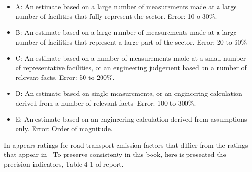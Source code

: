 \documentclass[12pt,graybox,envcountchap,sectrefs]{krantz}
\providecommand{\tightlist}{%
  \setlength{\itemsep}{0pt}\setlength{\parskip}{0pt}}
\theoremstyle{definition}
\theoremstyle{definition}
\theoremstyle{definition}
\theoremstyle{remark}
\begin{document}
\begin{itemize}
\tightlist
\item
  A: An estimate based on a large number of measurements made at a large
  number of facilities that fully represent the sector. Error: 10 o
  30\%.
\item
  B: An estimate based on a large number of measurements made at a large
  number of facilities that represent a large part of the sector. Error:
  20 to 60\%
\item
  C: An estimate based on a number of measurements made at a small
  number of representative facilities, or an engineering judgement based
  on a number of relevant facts. Error: 50 to 200\%.
\item
  D: An estimate based on single measurements, or an engineering
  calculation derived from a number of relevant facts. Error: 100 to
  300\%.
\item
  E: An estimate based on an engineering calculation derived from
  assumptions only. Error: Order of magnitude.
\end{itemize}

In \citet{guia} appears ratings for road transport emission factors that
diffier from the ratings that appear in
\citet{NtziachristosSamaras2016}. To preserve consistenty in this book,
here is presented the precision indicators, Table 4-1 of
\citet{NtziachristosSamaras2016} report.
\end{document}
